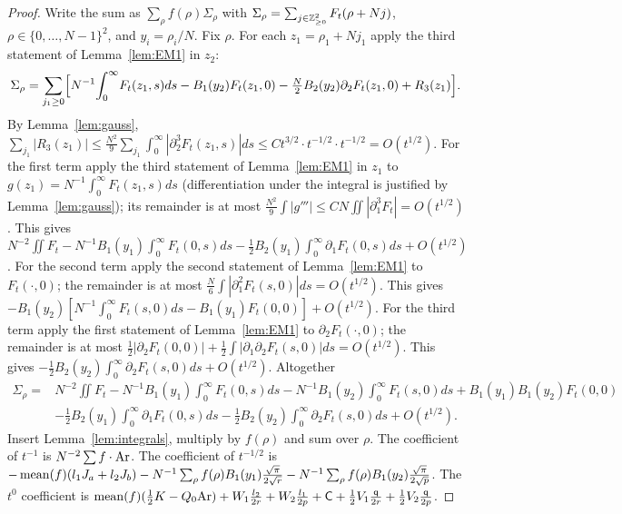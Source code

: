 \begin{proof}
Write the sum as $\sum_{\rho}f(\rho)\Sigma_\rho$ with $\Sigma_\rho=\sum_{j\in\mathbb{Z}^2_{\ge0}}F_t(\rho+Nj)$, $\rho\in\{0,\dots,N-1\}^2$, and $y_i=\rho_i/N$.
Fix $\rho$. For each $z_1=\rho_1+Nj_1$ apply the third statement of Lemma~\ref{lem:EM1} in $z_2$:
\[
\Sigma_\rho=\sum_{j_1\ge0}\Bigl[N^{-1}\!\int_0^\infty\!F_t(z_1,s)ds-B_1(y_2)F_t(z_1,0)-\tfrac N2B_2(y_2)\partial_2F_t(z_1,0)+R_3(z_1)\Bigr].
\]
By Lemma~\ref{lem:gauss}, $\sum_{j_1}|R_3(z_1)|\le\frac{N^2}9\sum_{j_1}\int_0^\infty|\partial_2^3F_t(z_1,s)|ds\le Ct^{3/2}\cdot t^{-1/2}\cdot t^{-1/2}=O(t^{1/2})$.
For the first term apply the third statement of Lemma~\ref{lem:EM1} in $z_1$ to $g(z_1)=N^{-1}\int_0^\infty F_t(z_1,s)ds$ (differentiation under the integral
is justified by Lemma~\ref{lem:gauss}); its remainder is at most $\frac{N^2}9\int|g'''|\le CN\iint|\partial_1^3F_t|=O(t^{1/2})$. This gives
$N^{-2}\iint F_t-N^{-1}B_1(y_1)\int_0^\infty F_t(0,s)ds-\frac12B_2(y_1)\int_0^\infty\partial_1F_t(0,s)ds+O(t^{1/2})$.
For the second term apply the second statement of Lemma~\ref{lem:EM1} to $F_t(\cdot,0)$; the remainder is at most $\frac N6\int|\partial_1^2F_t(s,0)|ds=O(t^{1/2})$.
This gives $-B_1(y_2)[N^{-1}\int_0^\infty F_t(s,0)ds-B_1(y_1)F_t(0,0)]+O(t^{1/2})$.
For the third term apply the first statement of Lemma~\ref{lem:EM1} to $\partial_2F_t(\cdot,0)$; the remainder is at most
$\frac12|\partial_2F_t(0,0)|+\frac12\int|\partial_1\partial_2F_t(s,0)|ds=O(t^{1/2})$. This gives $-\frac12B_2(y_2)\int_0^\infty\partial_2F_t(s,0)ds+O(t^{1/2})$.
Altogether
\begin{align*}
\Sigma_\rho=&N^{-2}\iint F_t-N^{-1}B_1(y_1)\int_0^\infty F_t(0,s)ds-N^{-1}B_1(y_2)\int_0^\infty F_t(s,0)ds+B_1(y_1)B_1(y_2)F_t(0,0)\\
&-\tfrac12B_2(y_1)\int_0^\infty\partial_1F_t(0,s)ds-\tfrac12B_2(y_2)\int_0^\infty\partial_2F_t(s,0)ds+O(t^{1/2}).
\end{align*}
Insert Lemma~\ref{lem:integrals}, multiply by $f(\rho)$ and sum over $\rho$. The coefficient of $t^{-1}$ is $N^{-2}\sum f\cdot\mathrm{Ar}$. The coefficient of $t^{-1/2}$ is
$-\operatorname{mean}(f)(l_1J_a+l_2J_b)-N^{-1}\sum_\rho f(\rho)B_1(y_1)\frac{\sqrt\pi}{2\sqrt r}-N^{-1}\sum_\rho f(\rho)B_1(y_2)\frac{\sqrt\pi}{2\sqrt p}$. The $t^0$ coefficient is
$\operatorname{mean}(f)(\frac12K-Q_0\mathrm{Ar})+W_1\frac{l_2}{2r}+W_2\frac{l_1}{2p}+\mathsf C+\frac12V_1\frac{\mathsf q}{2r}+\frac12V_2\frac{\mathsf q}{2p}$.
\end{proof}


